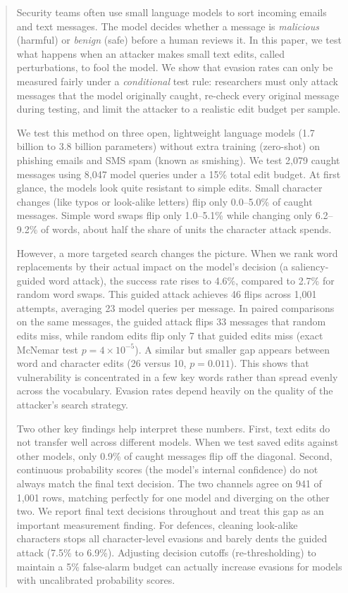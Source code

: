 \begin{abstract}
Security teams often use small language models to sort incoming emails and
text messages. The model decides whether a message is \emph{malicious}
(harmful) or \emph{benign} (safe) before a human reviews it. In this paper,
we test what happens when an attacker makes small text edits, called
perturbations, to fool the model. We show that evasion rates can only be
measured fairly under a \emph{conditional} test rule: researchers must only
attack messages that the model originally caught, re-check every original
message during testing, and limit the attacker to a realistic edit budget per
sample.

We test this method on three open, lightweight language models (1.7 billion to
3.8 billion parameters) without extra training (zero-shot) on phishing emails
and SMS spam (known as smishing). We test 2{,}079 caught messages using 8{,}047
model queries under a 15\% total edit budget. At first glance, the models look
quite resistant to simple edits. Small character changes (like typos or
look-alike letters) flip only 0.0--5.0\% of caught messages. Simple word swaps
flip only 1.0--5.1\% while changing only 6.2--9.2\% of words, about half the
share of units the character attack spends.

However, a more targeted search changes the picture. When we rank word
replacements by their actual impact on the model's decision (a saliency-guided
word attack), the success rate rises to 4.6\%, compared to 2.7\% for random word
swaps. This guided attack achieves 46 flips across 1{,}001 attempts, averaging 23
model queries per message. In paired comparisons on the same messages, the
guided attack flips 33 messages that random edits miss, while
random edits flip only 7 that guided edits miss (exact McNemar test
$p=4\times10^{-5}$). A similar but smaller gap appears between word and
character edits (26 versus 10, $p=0.011$). This shows that vulnerability is
concentrated in a few key words rather than spread evenly across the vocabulary.
Evasion rates depend heavily on the quality of the attacker's search strategy.

Two other key findings help interpret these numbers. First, text edits do not
transfer well across different models. When we test saved edits against other
models, only 0.9\% of caught messages flip off the diagonal. Second,
continuous probability scores (the model's internal confidence) do not always
match the final text decision. The two channels agree on 941 of 1{,}001 rows,
matching perfectly for one model and diverging on the other two. We report final
text decisions throughout and treat this gap as an important measurement
finding. For defences, cleaning look-alike characters stops all character-level
evasions and barely dents the guided attack (7.5\% to 6.9\%). Adjusting decision
cutoffs (re-thresholding) to maintain a 5\% false-alarm budget can actually
increase evasions for models with uncalibrated probability scores.


\end{abstract}
